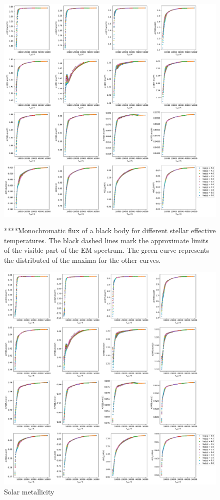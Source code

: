 \documentclass[12pt, a4paper]{report}
\begin{document}
\begin{figure}[h]
\begin{center}
\includegraphics[scale=0.3]{../just_full_data/comb/AHub_FeHm2p0_just_Teff_fit_plot_dots.pdf}
\caption{****Monochromatic flux of a black body for different stellar effective temperatures. The black dashed lines mark the approximate limits of the visible part of the EM spectrum. The green curve represents the distributed of the maxima for the other curves.}
\label{Ax/Av data FeH=-2}

\includegraphics[scale=0.3]{../just_full_data/comb/AHub_FeH0p0_just_Teff_fit_plot_dots.pdf}
\caption{Solar metallicity}
\label{Ax/Av data FeH=0}
\end{center}
\end{figure}
\end{document}
